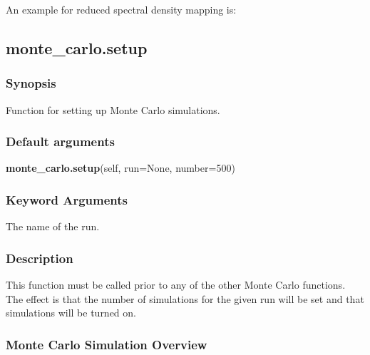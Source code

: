 

An example for reduced spectral density mapping is:





\newpage

\subsection{monte\_carlo.setup}


\subsubsection{Synopsis}

Function for setting up Monte Carlo simulations.

\subsubsection{Default arguments}

\textsf{\textbf{monte\_carlo.setup}(self, run=None, number=500)}


\subsubsection{Keyword Arguments}

  The name of the run.


\subsubsection{Description}

This function must be called prior to any of the other Monte Carlo functions.  The effect is
that the number of simulations for the given run will be set and that simulations will be
turned on.



\subsubsection{Monte Carlo Simulation Overview}

